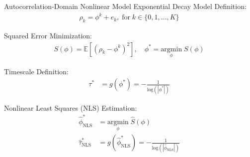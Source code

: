 \documentclass[8pt,aspectratio=169]{beamer}
\begin{document}
\begin{frame}{Autocorrelation-Domain Nonlinear Model}
\vfill
Exponential Decay Model Definition:
\begin{align}\label{eq:nlm}
    \rho_k = \phi^k + e_k, \; \text{for}\; k \in \{0, 1, \ldots, K\}
\end{align}

Squared Error Minimization:
\begin{align}\label{eq:nlm_loss}
    S(\phi) = \mathbb{E}[(\rho_k - \phi^k)^2], \quad \phi^* = \underset{\phi}{\text{argmin}} \; S(\phi)
\end{align}

Timescale Definition:
\begin{align}
    \tau^* &= g(\phi^*) = -\frac{1}{\text{log}(|\phi^*|)} \label{eq:nlm-tau}
\end{align}

Nonlinear Least Squares (NLS) Estimation:
\begin{align}
    \hat \phi^*_{\scriptscriptstyle\text{NLS}} &= \underset{\phi}{\text{argmin}} \; \widehat{S}(\phi) \label{eq:nls_phi_}\\
    \hat \tau^*_{\scriptscriptstyle\text{NLS}} &= g(\hat \phi^*_{\scriptscriptstyle\text{NLS}}) = -\frac{1}{\text{log}(|\hat\phi_{\scriptscriptstyle\text{NLS}}|)}
\end{align}

\end{frame}
\end{document}

